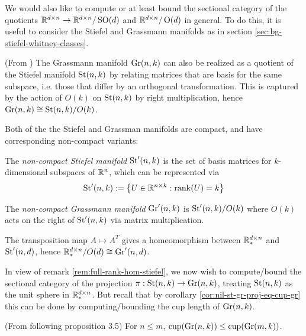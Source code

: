 We would also like to compute or at least bound the sectional category of the quotients $\mathbb{R}^{d \times n} \to \mathbb{R}^{d \times n} / \operatorname{SO}(d)$ and $\mathbb{R}^{d \times n} / \operatorname{O}(d)$ in general.
To do this, it is useful to consider the Stiefel and Grassmann manifolds as in section \ref{sec:bg-stiefel-whitney-classes}.


\begin{remark}
    (From \cite{bendokat2024grassmanhandbook})
    The Grassmann manifold $\operatorname{Gr}(n,k)$ can also be realized as a quotient of the Stiefel manifold $\operatorname{St}(n,k)$ by relating matrices that are basis for the same subspace, i.e. those that differ by an orthogonal transformation.
    This is captured by the action of $O(k)$ on $\operatorname{St}(n,k)$ by right multiplication, hence $\operatorname{Gr}(n,k) \cong \operatorname{St}(n,k) / O(k)$.
\end{remark}

Both of the the Stiefel and Grassman manifolds are compact, and have corresponding non-compact variants:

\begin{definition}
    The \emph{non-compact Stiefel manifold} $\operatorname{St}'(n,k)$ is the set of basis matrices for $k$-dimensional subspaces of $\mathbb{R}^n$, which can be represented via
    \[
        \operatorname{St}'(n,k) := \left\{ U \in \mathbb{R}^{n \times k} : \operatorname{rank}(U) = k \right\}
    \]
\end{definition}

\begin{definition}
    The \emph{non-compact Grassmann manifold} $\operatorname{Gr}'(n,k)$ is $\operatorname{St}'(n,k) / O(k)$ where $O(k)$ acts on the right of $\operatorname{St}'(n,k)$ via matrix multiplication.
\end{definition}

\begin{remark}\label{rem:full-rank-hom-stiefel}
    The transposition map $A \mapsto A^T$ gives a homeomorphism between $\mathbb{R}^{d \times n}_*$ and $\operatorname{St}'(n,d)$, hence $\mathbb{R}^{d \times n}_* / O(d) \cong \operatorname{Gr}'(n,d)$.
\end{remark}

In view of remark \ref{rem:full-rank-hom-stiefel}, we now wish to compute/bound the sectional category of the projection $\pi : \operatorname{St}(n,k) \to \operatorname{Gr}(n,k)$, treating $\operatorname{St}(n,k)$ as the unit sphere in $\mathbb{R}^{d \times n}_*$.
But recall that by corollary \ref{cor:nil-st-gr-proj-eq-cup-gr} this can be done by computing/bounding the cup length of $\operatorname{Gr}(n,k)$.

\begin{proposition}\label{prop:cup-Grnk-monotonicity}
    (From \cite{pavesic2021} following proposition 3.5)
    For $n \leq m$, $\operatorname{cup}(\operatorname{Gr}(n,k)) \leq \operatorname{cup}(\operatorname{Gr}(m,k))$.
\end{proposition}

